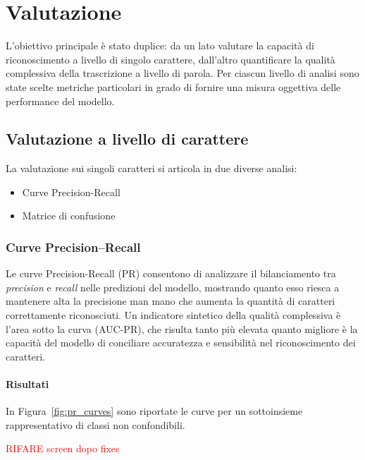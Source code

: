 \chapter{Valutazione}
L'obiettivo principale è stato duplice: da un lato valutare la capacità di riconoscimento a livello di singolo carattere, dall'altro quantificare la qualità complessiva della trascrizione a livello di parola. Per ciascun livello di analisi sono state scelte metriche particolari in grado di fornire una misura oggettiva delle performance del modello.

\section{Valutazione a livello di carattere}
\label{sec:valutazione-caratteri}
La valutazione sui singoli caratteri si articola in due diverse analisi:
\begin{itemize}
    \item Curve Precision-Recall
    \item Matrice di confusione
\end{itemize}

\subsection{Curve Precision–Recall}
Le curve Precision-Recall (PR) consentono di analizzare il bilanciamento tra \emph{precision} e \emph{recall} nelle predizioni del modello, mostrando quanto esso riesca a mantenere alta la precisione man mano che aumenta la quantità di caratteri correttamente riconosciuti. Un indicatore sintetico della qualità complessiva è l'area sotto la curva (AUC-PR), che risulta tanto più elevata quanto migliore è la capacità del modello di conciliare accuratezza e sensibilità nel riconoscimento dei caratteri.

\subsubsection{Risultati}
In Figura~\ref{fig:pr_curves} sono riportate le curve per un sottoinsieme rappresentativo di classi non confondibili.

\textcolor{red}{RIFARE screen dopo fixes}

